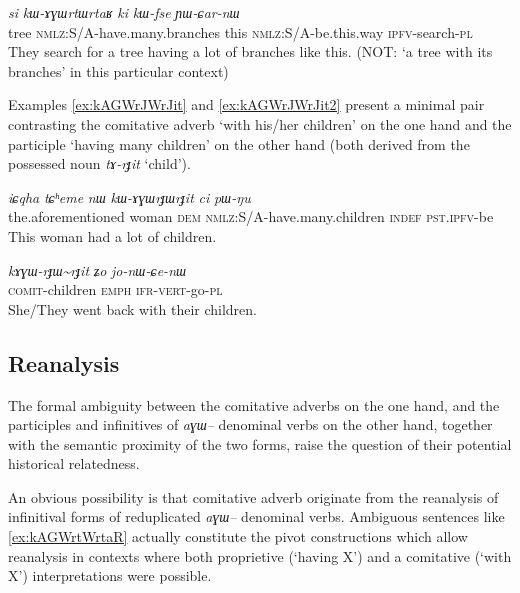 \documentclass[oldfontcommands,oneside,a4paper,11pt]{article}
\newcommand{\ipa}[1]{{\phon\textit{#1}}} %
\newcommand{\tld}{\textasciitilde{}}
\begin{document}
  \begin{exe}
\ex \label{ex:kAGWrtWrtaR}
\gll   
  \ipa{si} 	\ipa{kɯ-ɤɣɯrtɯrtaʁ} 	\ipa{ki} 	\ipa{kɯ-fse} 	\ipa{ɲɯ-ɕar-nɯ} \\
  tree \textsc{nmlz}:S/A-have.many.branches this \textsc{nmlz}:S/A-be.this.way \textsc{ipfv}-search-\textsc{pl} \\
\glt They search for a tree having a lot of branches like this. (NOT: `a tree with its branches' in this particular context)
\end{exe}

Examples \ref{ex:kAGWrJWrJit} and \ref{ex:kAGWrJWrJit2} present a minimal pair contrasting the comitative adverb  `with his/her children' on the one hand and the participle  `having many children' on the other hand (both derived from the possessed noun  \ipa{tɤ-rɟit} `child').

\begin{exe}
\ex \label{ex:kAGWrJWrJit}
\gll   
\ipa{iɕqha} 	\ipa{tɕʰeme} 	\ipa{nɯ} 	\ipa{kɯ-ɤɣɯrɟɯrɟit} 	\ipa{ci} 	\ipa{pɯ-ŋu}  \\
the.aforementioned woman \textsc{dem} \textsc{nmlz}:S/A-have.many.children \textsc{indef} \textsc{pst.ipfv}-be \\
\glt This woman had a lot of children.
\end{exe}

\begin{exe}
\ex \label{ex:kAGWrJWrJit2}
\gll   
\ipa{kɤɣɯ-rɟɯ\tld{}rɟit} 	\ipa{ʑo} 	\ipa{jo-nɯ-ɕe-nɯ} \\
\textsc{comit}-children \textsc{emph} \textsc{ifr-vert}-go-\textsc{pl} \\
\glt She/They went back with their children.
\end{exe}



\subsection{Reanalysis}
The formal ambiguity between the comitative adverbs on the one hand, and the participles and infinitives of \ipa{aɣɯ--} denominal verbs on the other hand, together with the semantic proximity of the two forms, raise the question of their potential historical relatedness.

An obvious possibility is that comitative adverb originate from the reanalysis of infinitival forms of reduplicated \ipa{aɣɯ--} denominal verbs. Ambiguous sentences like \ref{ex:kAGWrtWrtaR} actually constitute the pivot constructions which allow reanalysis in contexts where both proprietive (`having X') and a comitative (`with X') interpretations were possible.
\end{document}
